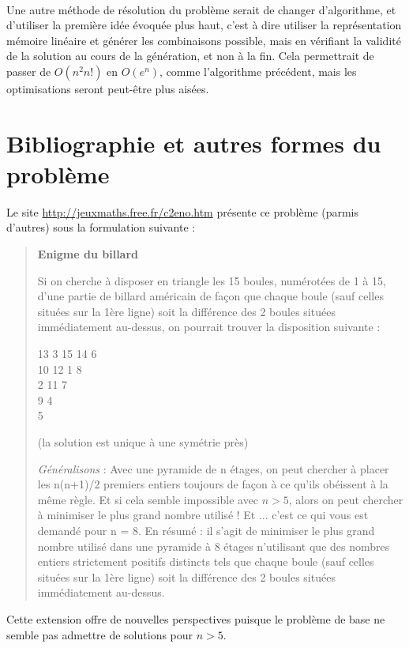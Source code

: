 \documentclass[10pt]{article}%
\begin{document}
\paragraph*{}
Une autre méthode de résolution du problème serait de changer d'algorithme, et d'utiliser la première
idée évoquée plus haut, c'est à dire utiliser la représentation mémoire linéaire et générer les
combinaisons possible, mais en vérifiant la validité de la solution au cours de la génération, et non
à la fin. Cela permettrait de passer de $O(n^2 n!)$ en $O(e^n)$, comme l'algorithme précédent, mais
les optimisations seront peut-être plus aisées.



\section{Bibliographie et autres formes du problème}
Le site \url{http://jeuxmaths.free.fr/c2eno.htm} présente ce problème (parmis
d'autres) sous la formulation suivante :
\begin{quote}
  \textbf{Enigme du billard}

  Si on cherche à disposer en triangle les 15 boules, numérotées de 1 à 15,
  d'une partie de billard américain de façon que chaque boule (sauf celles
  situées sur la 1ère ligne) soit la différence des 2 boules situées
  immédiatement au-dessus, on pourrait trouver la disposition suivante :

  13 3 15 14 6\\
  10 12 1 8\\
  2 11 7\\
  9 4\\
  5

  (la solution est unique à une symétrie près)

  \textit{Généralisons} : Avec une pyramide de n étages, on peut chercher à
  placer les n(n+1)/2 premiers entiers toujours de façon à ce qu'ils obéissent
  à la même règle. Et si cela semble impossible avec $n>5$, alors on peut
  chercher à minimiser le plus grand nombre utilisé ! Et ... c'est ce qui vous
  est demandé pour n = 8.  En résumé : il s'agit de minimiser le plus grand
  nombre utilisé dans une pyramide à 8 étages n'utilisant que des nombres
  entiers strictement positifs distincts tels que chaque boule (sauf celles
  situées sur la 1ère ligne) soit la différence des 2 boules situées
  immédiatement au-dessus.
\end{quote}

Cette extension offre de nouvelles perspectives puisque le problème de base ne
semble pas admettre de solutions pour $n>5$. 
\end{document}

